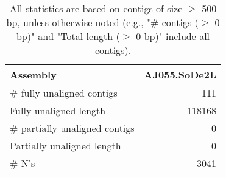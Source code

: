 \documentclass[12pt,a4paper]{article}
\begin{document}
\begin{table}[ht]
\begin{center}
\caption{All statistics are based on contigs of size $\geq$ 500 bp, unless otherwise noted (e.g., "\# contigs ($\geq$ 0 bp)" and "Total length ($\geq$ 0 bp)" include all contigs).}
\begin{tabular}{|l*{1}{|r}|}
\hline
Assembly & AJ055.SoDe2L \\ \hline
\# fully unaligned contigs & 111 \\ \hline
Fully unaligned length & 118168 \\ \hline
\# partially unaligned contigs & 0 \\ \hline
Partially unaligned length & 0 \\ \hline
\# N's & 3041 \\ \hline
\end{tabular}
\end{center}
\end{table}
\end{document}
